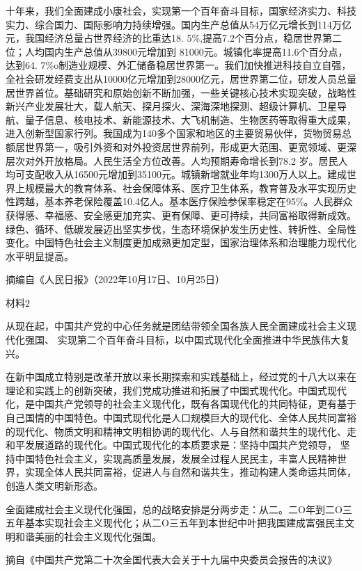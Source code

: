\documentclass[UTF8,11pt]{ctexart}
\begin{document}
十年来，我们全面建成小康社会，实现第一个百年奋斗目标，国家经济实力、科技实力、综合国力、国际影响力持续增强。国内生产总值从54万亿元增长到114万亿元，我国经济总量占世界经济的比重达18. 5\%,提高7.2个百分点，稳居世界第二位；人均国内生产总值从39800元增加到 81000元。城镇化率提高11.6个百分点，达到64. 7\%o制造业规模、外汇储备稳居世界第一。我们加快推进科技自立自强，全社会研发经费支出从10000亿元增加到28000亿元，居世界第二位，研发人员总量居世界首位。基础研究和原始创新不断加强，一些关键核心技术实现突破，战略性新兴产业发展壮大，载人航天、探月探火、深海深地探测、超级计算机、卫星导航、量子信息、核电技术、新能源技术、大飞机制造、生物医药等取得重大成果，进入创新型国家行列。我国成为140多个国家和地区的主要贸易伙伴，货物贸易总额居世界第一，吸引外资和对外投资居世界前列，形成更大范围、更宽领域、更深层次对外开放格局。人民生活全方位改善。人均预期寿命增长到78.2 岁。居民人均可支配收入从16500元增加到35100元。城镇新增就业年均1300万人以上。建成世界上规模最大的教育体系、社会保障体系、医疗卫生体系，教育普及水平实现历史性跨越，基本养老保险覆盖10.4亿人。基本医疗保险参保率稳定在95\%。人民群众获得感、幸福感、安全感更加充实、更有保障、更可持续，共同富裕取得新成效。绿色、循环、低碳发展迈出坚实步伐，生态环境保护发生历史性、转折性、全局性变化。中国特色社会主义制度更加成熟更加定型，国家治理体系和治理能力现代化水平明显提高。

摘编自《人民日报》（2022年10月17日、10月25日）

材料2

从现在起，中国共产党的中心任务就是团结带领全国各族人民全面建成社会主义现代化强国、 实现第二个百年奋斗目标，以中国式现代化全面推进中华民族伟大复兴。

在新中国成立特别是改革开放以来长期探索和实践基础上，经过党的十八大以来在理论和实践上的创新突破，我们党成功推进和拓展了中国式现代化。中国式现代化，是中国共产党领导的社会主义现代化，既有各国现代化的共同特征，更有基于自己国情的中国特色。中国式现代化是人口规模巨大的现代化、全体人民共同富裕的现代化、物质文明和精神文明相协调的现代化、人与自然和谐共生的现代化、走和平发展道路的现代化。中国式现代化的本质要求是：坚持中国共产党领导， 坚持中国特色社会主义，实现高质量发展，发展全过程人民民主，丰富人民精神世界，实现全体人民共同富裕，促进人与自然和谐共生，推动构建人类命运共同体，创造人类文明新形态。

全面建成社会主义现代化强国，总的战略安排是分两步走：从二。二O年到二O三五年基本实现社会主义现代化；从二O三五年到本世纪中叶把我国建成富强民主文明和谐美丽的社会主义现代化强国。

摘自《中国共产党第二十次全国代表大会关于十九届中央委员会报告的决议》
\end{document}
